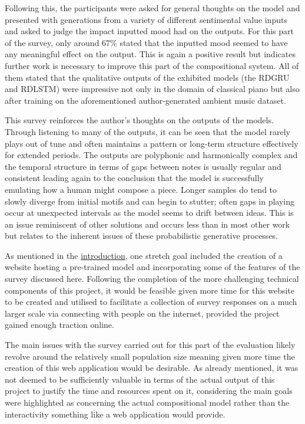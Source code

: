 \documentclass[12pt,]{article}
\begin{document}
Following this, the participants were asked for general thoughts on the
model and presented with generations from a variety of different
sentimental value inputs and asked to judge the impact inputted mood had
on the outputs. For this part of the survey, only around 67\% stated
that the inputted mood seemed to have any meaningful effect on the
output. This is again a positive result but indicates further work is
necessary to improve this part of the compositional system. All of them
stated that the qualitative outputs of the exhibited models (the RDGRU
and RDLSTM) were impressive not only in the domain of classical piano
but also after training on the aforementioned author-generated ambient
music dataset.

This survey reinforces the author's thoughts on the outputs of the
models. Through listening to many of the outputs, it can be seen that
the model rarely plays out of tune and often maintains a pattern or
long-term structure effectively for extended periods. The outputs are
polyphonic and harmonically complex and the temporal structure in terms
of gaps between notes is usually regular and consistent leading again to
the conclusion that the model is successfully emulating how a human
might compose a piece. Longer samples do tend to slowly diverge from
initial motifs and can begin to stutter; often gaps in playing occur at
unexpected intervals as the model seems to drift between ideas. This is
an issue reminiscent of other solutions and occurs less than in most
other work but relates to the inherent issues of these probabilistic
generative processes.

As mentioned in the \protect\hyperlink{introduction}{introduction}, one
stretch goal included the creation of a website hosting a pre-trained
model and incorporating some of the features of the survey discussed
here. Following the completion of the more challenging technical
components of this project, it would be feasible given more time for
this website to be created and utilised to facilitate a collection of
survey responses on a much larger scale via connecting with people on
the internet, provided the project gained enough traction online.

The main issues with the survey carried out for this part of the
evaluation likely revolve around the relatively small population size
meaning given more time the creation of this web application would be
desirable. As already mentioned, it was not deemed to be sufficiently
valuable in terms of the actual output of this project to justify the
time and resources spent on it, considering the main goals were
highlighted as concerning the actual compositional model rather than the
interactivity something like a web application would provide.
\end{document}
